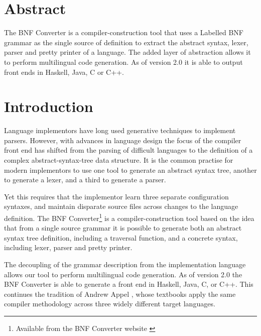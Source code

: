 %


\section*{Abstract}
The BNF Converter is a compiler-construction tool that uses a Labelled BNF
grammar as the single source of definition to extract the abstract syntax,
lexer, parser and pretty printer of a language. The added layer of abstraction allows it
to perform multilingual code generation. As of version 2.0 it is able to
output front ends in Haskell, Java, C or C++.

\section{Introduction}

Language implementors have long used generative techniques to implement
parsers. However, with advances in language design the focus of the
compiler front end has shifted from the parsing of difficult languages to
the definition of a complex abstract-syntax-tree data structure. It is the
common practise for modern implementors to use one tool to generate an abstract
syntax tree, another to generate a lexer, and a third to generate a
parser.

Yet this requires that the implementor learn three separate configuration
syntaxes, and maintain disparate source files across changes to the
language definition. The BNF Converter\footnote{
Available from the BNF Converter website \cite{bnfcsite}
}
is a compiler-construction tool based on the idea that from a single
source grammar it is possible to generate both an abstract syntax tree
definition, including a traversal function, and a concrete syntax, 
including lexer, parser and pretty printer.


The decoupling of the grammar description from the implementation language
allows our tool to perform multilingual code generation. As of version 2.0
the BNF Converter is able to generate a front end in Haskell, Java, C, or
C++. This continues the tradition of Andrew Appel
\cite{AppelC,AppelJ,appel}, whose textbooks apply the same compiler
methodology across three widely different target languages.



